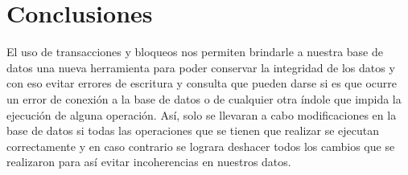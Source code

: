 \documentclass[12pt, titlepage]{article}
\begin{document}
	\section{Conclusiones}
	El uso de transacciones y bloqueos nos permiten brindarle a nuestra base de datos una nueva herramienta para poder conservar la integridad de los datos y con eso evitar errores de escritura y consulta que pueden darse si es que ocurre un error de conexión a la base de datos o de cualquier otra índole que impida la ejecución de alguna operación. Así, solo se llevaran a cabo modificaciones en la base de datos si todas las operaciones que se tienen que realizar se ejecutan correctamente y en caso contrario se lograra deshacer todos los cambios que se realizaron para así evitar incoherencias en nuestros datos.
	 
	
\end{document}
